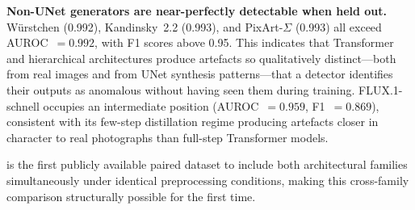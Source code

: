 \textbf{Non-UNet generators are near-perfectly detectable when held out.}
W\"{u}rstchen (0.992), Kandinsky~2.2 (0.993), and PixArt-$\Sigma$
(0.993) all exceed AUROC~$= 0.992$, with F1 scores above 0.95.
This indicates that Transformer and hierarchical architectures produce
artefacts so qualitatively distinct---both from real images and from
UNet synthesis patterns---that a detector identifies their outputs as
anomalous without having seen them during training.
FLUX.1-schnell occupies an intermediate position
(AUROC~$= 0.959$, F1~$= 0.869$), consistent with its few-step
distillation regime producing artefacts closer in character to real
photographs than full-step Transformer models.

\textbf{\datasetname} is the first publicly available paired dataset
to include both architectural families simultaneously under identical
preprocessing conditions, making this cross-family comparison
structurally possible for the first time.

